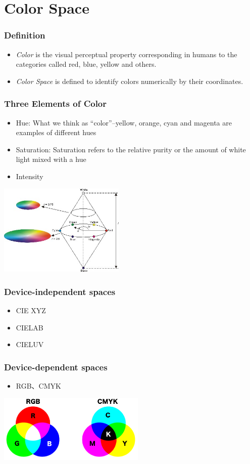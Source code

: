 \documentclass[notheorems,serif,table,compress]{beamer}  %
\begin{document}
\section{Color Space}


\begin{frame}
\frametitle{Definition}
\begin{itemize}
\item {\color{blue}\emph{Color}} is the visual perceptual property corresponding in humans to the categories called red, blue, yellow and others.
\item {\color{blue}\emph{Color Space}} is defined to identify colors numerically by their coordinates.
\end{itemize}
\end{frame}


\begin{frame}
\frametitle{Three Elements of Color}
\begin{itemize}
\item Hue: What we think as ``color''--yellow, orange, cyan and magenta are examples of different hues
\item Saturation: Saturation refers to the relative purity or the amount of white light mixed with a hue
\item Intensity
\end{itemize}
\centering\includegraphics[width=6cm]{HSIColorModel.jpg}
\end{frame}


\begin{frame}
\frametitle{Device-independent spaces}
\begin{itemize}
\item CIE XYZ
\item CIELAB
\item CIELUV
\end{itemize}
\end{frame}


\begin{frame}
\frametitle{Device-dependent spaces}
\begin{itemize}
\item RGB、CMYK
\end{itemize}

\centering\includegraphics[width=7cm]{RGB_CMYK.png}
\end{frame}
\end{document}
